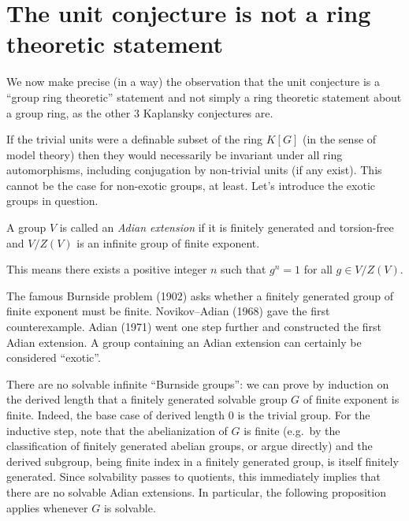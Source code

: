 \section{The unit conjecture is not a ring theoretic statement}

We now make precise (in a way) the observation that the unit conjecture is a ``group ring theoretic'' statement and not simply a ring theoretic statement about a group ring, as the other $3$ Kaplansky conjectures are.

If the trivial units were a definable subset of the ring $K[G]$ (in the sense of model theory) then they would necessarily be invariant under all ring automorphisms, including conjugation by non-trivial units (if any exist).
This cannot be the case for non-exotic groups, at least.
Let's introduce the exotic groups in question.

\begin{definition}
    A group $V$ is called an \emph{Adian extension} if it is finitely generated and torsion-free and $V / Z(V)$ is an infinite group of finite exponent.
\end{definition}

This means there exists a positive integer $n$ such that $g^n = 1$ for all $g \in V / Z(V)$.

\begin{remark}
    The famous Burnside problem (1902) asks whether a finitely generated group of finite exponent must be finite.
    Novikov--Adian (1968) gave the first counterexample.
    Adian (1971) went one step further and constructed the first Adian extension.
    A group containing an Adian extension can certainly be considered ``exotic''.
\end{remark}

\begin{example}
    There are no solvable infinite ``Burnside groups'': we can prove by induction on the derived length that a finitely generated solvable group $G$ of finite exponent is finite.
    Indeed, the base case of derived length $0$ is the trivial group.
    For the inductive step, note that the abelianization of $G$ is finite (e.g.\ by the classification of finitely generated abelian groups, or argue directly) and the derived subgroup, being finite index in a finitely generated group, is itself finitely generated.
    Since solvability passes to quotients, this immediately implies that there are no solvable Adian extensions.
    In particular, the following proposition applies whenever $G$ is solvable.
\end{example}

